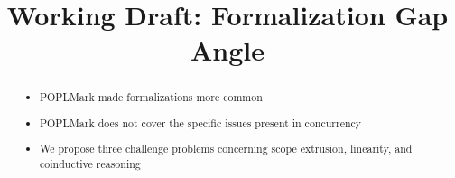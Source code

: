 \documentclass{article}
\begin{document}
\title{Working Draft: Formalization Gap Angle}

\maketitle

\begin{abstract}
  \noindent
  \begin{itemize}
  \item POPLMark made formalizations more common
  \item POPLMark does not cover the specific issues present in concurrency
  \item We propose three challenge problems concerning scope extrusion, linearity, and coinductive reasoning
  \end{itemize}
\end{abstract}
\end{document}
